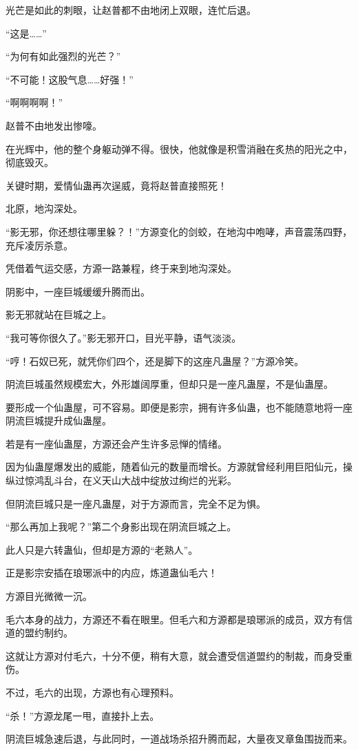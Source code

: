 \begin{this_body}
光芒是如此的刺眼，让赵普都不由地闭上双眼，连忙后退。

“这是……”

“为何有如此强烈的光芒？”

“不可能！这股气息……好强！”

“啊啊啊啊！”

赵普不由地发出惨嚎。

在光辉中，他的整个身躯动弹不得。很快，他就像是积雪消融在炙热的阳光之中，彻底毁灭。

关键时期，爱情仙蛊再次逞威，竟将赵普直接照死！

北原，地沟深处。

“影无邪，你还想往哪里躲？！”方源变化的剑蛟，在地沟中咆哮，声音震荡四野，充斥凌厉杀意。

凭借着气运交感，方源一路兼程，终于来到地沟深处。

阴影中，一座巨城缓缓升腾而出。

影无邪就站在巨城之上。

“我可等你很久了。”影无邪开口，目光平静，语气淡淡。

“哼！石奴已死，就凭你们四个，还是脚下的这座凡蛊屋？”方源冷笑。

阴流巨城虽然规模宏大，外形雄阔厚重，但却只是一座凡蛊屋，不是仙蛊屋。

要形成一个仙蛊屋，可不容易。即便是影宗，拥有许多仙蛊，也不能随意地将一座阴流巨城提升成仙蛊屋。

若是有一座仙蛊屋，方源还会产生许多忌惮的情绪。

因为仙蛊屋爆发出的威能，随着仙元的数量而增长。方源就曾经利用巨阳仙元，操纵过惊鸿乱斗台，在义天山大战中绽放过绚烂的光彩。

但阴流巨城只是一座凡蛊屋，对于方源而言，完全不足为惧。

“那么再加上我呢？”第二个身影出现在阴流巨城之上。

此人只是六转蛊仙，但却是方源的“老熟人”。

正是影宗安插在琅琊派中的内应，炼道蛊仙毛六！

方源目光微微一沉。

毛六本身的战力，方源还不看在眼里。但毛六和方源都是琅琊派的成员，双方有信道的盟约制约。

这就让方源对付毛六，十分不便，稍有大意，就会遭受信道盟约的制裁，而身受重伤。

不过，毛六的出现，方源也有心理预料。

“杀！”方源龙尾一甩，直接扑上去。

阴流巨城急速后退，与此同时，一道战场杀招升腾而起，大量夜叉章鱼围拢而来。


\end{this_body}
